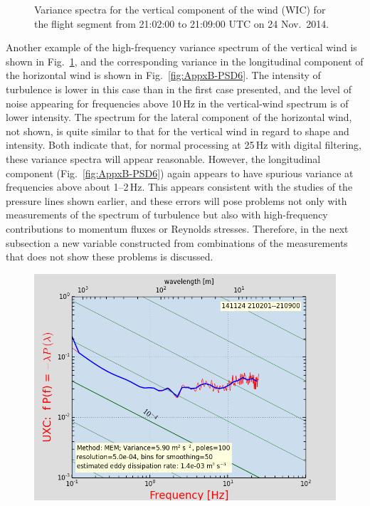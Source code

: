 \documentclass[12pt,twoside,english]{article}\usepackage[]{graphicx}\usepackage[]{color}
\let\OrgIndex\index
\renewcommand*{\index}[1]{\OrgIndex{#1}}
\begin{document}
{{\begin{appendices}
\begin{figure}
\protect\protect\protect\caption{\label{fig:AppxB-PSD5}Variance spectra for the vertical component of the wind (WIC) for the flight segment from 21:02:00 to 21:09:00 UTC on 24 Nov.\ 2014.} 
\end{figure}

Another example of the high-frequency variance spectrum of the vertical wind is shown in Fig.~\ref{fig:AppxB-PSD5}, and the corresponding variance in the longitudinal component of the horizontal wind is shown in Fig.~\ref{fig:AppxB-PSD6}. The intensity of turbulence is lower in this case than in the first case presented, and the level of noise appearing for frequencies above 10\,Hz in the vertical-wind spectrum is of lower intensity. The spectrum for the lateral component of the horizontal wind, not shown, is quite similar to that for the vertical wind in regard to shape and intensity. Both indicate that, for normal processing at 25\,Hz with digital filtering, these variance spectra will appear reasonable. However, the longitudinal component (Fig.~\ref{fig:AppxB-PSD6}) again appears to have spurious variance at frequencies above about 1--2\,Hz. This appears consistent with the studies of the pressure lines shown earlier, and these errors will pose problems not only with measurements of the spectrum of turbulence but also with high-frequency contributions to momentum fluxes or Reynolds stresses. Therefore, in the next subsection a new variable constructed from combinations of the measurements that does not show these problems is discussed. 

\begin{figure}
\noindent \begin{centering}
\includegraphics[height=0.4\textheight]{SpecialGraphics/PSD6.png}  
\par\end{centering}


\end{figure}
\end{appendices}}}
\end{document}
